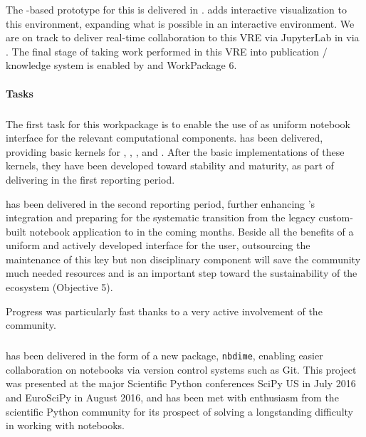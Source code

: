 The \Jupyter-based prototype for this is delivered in .
 adds interactive visualization to this environment,
expanding what is possible in an interactive \Jupyter environment.
We are on track to deliver real-time collaboration to this VRE via JupyterLab in  via .
The final stage of taking work performed in this VRE into publication / knowledge system is enabled by  and WorkPackage 6.

\paragraph{Tasks}

\subparagraph{}
\label{UI@ipython-kernels}

The first task for this workpackage is to enable the use of \Jupyter
as uniform notebook interface for the relevant computational
components.  has been delivered,
providing basic \Jupyter kernels for \GAP, \Pari, \Sage, and
\Singular.
After the basic implementations of these kernels,
they have been developed toward stability and maturity,
as part of delivering  in the first reporting period.

 has been delivered in the second reporting period, further
enhancing \Sage's \Jupyter integration and preparing for the
systematic transition from the legacy custom-built \Sage notebook
application to \Jupyter in the coming months. Beside all the benefits
of a uniform and actively developed interface for the user,
outsourcing the maintenance of this key but non disciplinary component
will save the \Sage community much needed resources and is an
important step toward the sustainability of the \ODK ecosystem
(Objective 5).

Progress was particularly fast thanks to a very active involvement of
the \Sage community.

\subparagraph{}
\label{UI@notebook-collab}

 has been delivered in the form of a new \Jupyter package, \texttt{nbdime},
enabling easier collaboration on notebooks via version control systems such as Git. This project
was presented at the major Scientific Python conferences SciPy US in July 2016 and EuroSciPy in August 2016,
and has been met with enthusiasm from the scientific Python community for its prospect of solving a
longstanding difficulty in working with notebooks.

